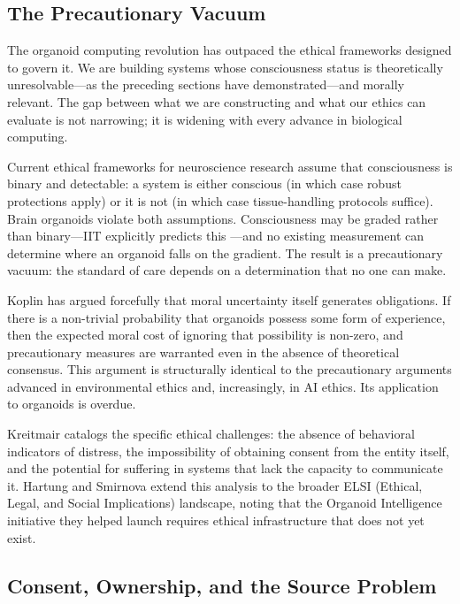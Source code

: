 
\subsection{The Precautionary Vacuum}

The organoid computing revolution has outpaced the ethical frameworks designed to govern it. We are building systems whose consciousness status is theoretically unresolvable---as the preceding sections have demonstrated---and morally relevant. The gap between what we are constructing and what our ethics can evaluate is not narrowing; it is widening with every advance in biological computing.

Current ethical frameworks for neuroscience research assume that consciousness is binary and detectable: a system is either conscious (in which case robust protections apply) or it is not (in which case tissue-handling protocols suffice). Brain organoids violate both assumptions. Consciousness may be graded rather than binary---IIT explicitly predicts this \cite{tononi2016integrated}---and no existing measurement can determine where an organoid falls on the gradient. The result is a precautionary vacuum: the standard of care depends on a determination that no one can make.

Koplin \cite{koplin2024organoid} has argued forcefully that moral uncertainty itself generates obligations. If there is a non-trivial probability that organoids possess some form of experience, then the expected moral cost of ignoring that possibility is non-zero, and precautionary measures are warranted even in the absence of theoretical consensus. This argument is structurally identical to the precautionary arguments advanced in environmental ethics and, increasingly, in AI ethics. Its application to organoids is overdue.

Kreitmair \cite{kreitmair2023ethics} catalogs the specific ethical challenges: the absence of behavioral indicators of distress, the impossibility of obtaining consent from the entity itself, and the potential for suffering in systems that lack the capacity to communicate it. Hartung and Smirnova \cite{hartung2024elsi} extend this analysis to the broader ELSI (Ethical, Legal, and Social Implications) landscape, noting that the Organoid Intelligence initiative they helped launch requires ethical infrastructure that does not yet exist.

\subsection{Consent, Ownership, and the Source Problem}

